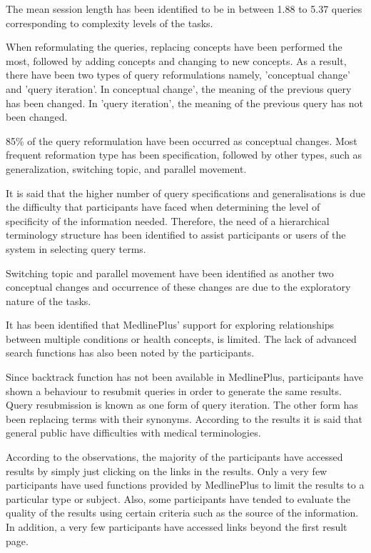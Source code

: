 \documentclass[]{article}
\begin{document}
The mean session length has been identified to be in between 1.88 to 5.37 queries corresponding to complexity levels of the tasks.

When reformulating the queries, replacing concepts have been performed the most, followed by adding concepts and changing to new concepts. As a result, there have been two types of query reformulations namely, 'conceptual change' and 'query iteration'. In conceptual change', the meaning of the previous query has been changed. In 'query iteration', the meaning of the previous query has not been changed.

85\% of the query reformulation have been occurred as conceptual changes. Most frequent reformation type has been specification, followed by other types, such as generalization, switching topic, and parallel movement.                        
       	           
It is said that the higher number of query specifications and generalisations is due the difficulty that participants have faced when determining the level of specificity of the information needed. Therefore, the need of a hierarchical terminology structure has been identified to assist participants or users of the system in selecting query terms.

Switching topic and parallel movement have been identified as another two conceptual changes and occurrence of these changes are due to the exploratory nature of the tasks. 

It has been identified that MedlinePlus' support for exploring relationships between multiple conditions or health concepts, is limited. The lack of advanced search functions has also been noted by the participants.

Since backtrack function has not been available in MedlinePlus, participants have shown a behaviour to resubmit queries in order to generate the same results. Query resubmission is known as one form of query iteration. The other form has been replacing terms with their synonyms. According to the results it is said that general public have difficulties with medical
terminologies. 

According to the observations, the majority of the participants have accessed results by simply just clicking on the links in the results. Only a very few participants have used functions provided by MedlinePlus to limit the results to a particular type or subject. Also, some participants have tended to evaluate the quality of the results using certain criteria such as the source of the information. In addition, a very few participants have accessed links beyond the first result page.
\end{document}
